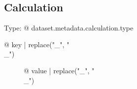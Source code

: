\subsection{Calculation}

Type: {@ dataset.metadata.calculation.type }

\begin{description}
\item[{@ key | replace("_", "\\_") }] {@ value | replace("_", "\\_") }
\end{description}
